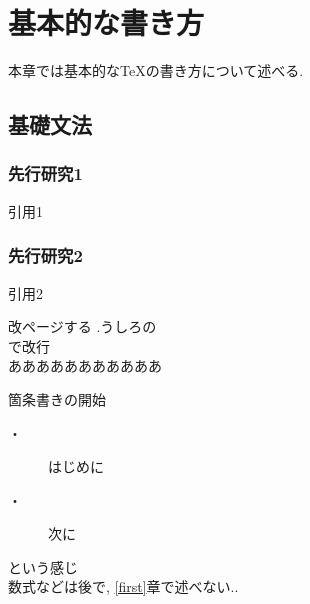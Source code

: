 \chapter{基本的な書き方 \label{first}}
本章では基本的なTeXの書き方について述べる. 

\section{基礎文法}

\subsection{先行研究1}
引用1\cite{citrfirst}
\subsection{先行研究2}
引用2\cite{citesecond}

改ページする
\newpage
.うしろの{\\}で改行\\
あああああああああああ

箇条書きの開始
\begin{description}
\item [・]はじめに 
\item [・]次に
\end{description}
という感じ\\
数式などは後で, \ref{first}章で述べない.. 